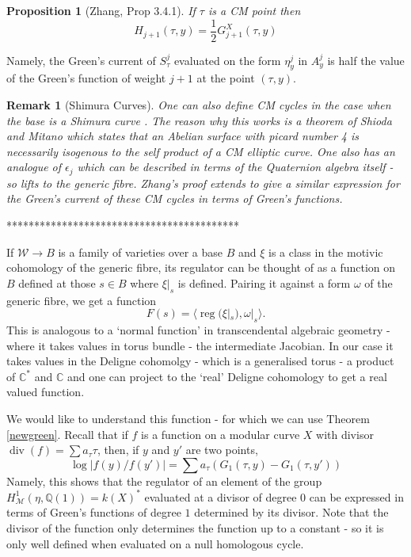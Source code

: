 \documentclass[11pt,a4paper]{article}
\newtheorem{prop}[defn]{Proposition}
\newtheorem{rem}[defn]{Remark}
\newcommand {\WW}{{\mathcal W}}
\newcommand {\C}{{\mathds C}}
\newcommand {\Q}{{\mathds Q}}
\newcommand {\M}{{\mathcal M}}
\def\div{\operatorname{div}}
\def\reg{\operatorname{reg}}
\begin{document}
\begin{prop}[Zhang, Prop 3.4.1] If $\tau$ is a CM point then  
%
$$H_{j+1}(\tau,y)=\frac{1}{2}G^X_{j+1}(\tau,y)$$
%
\end{prop}

Namely, the Green's current of $S^j_{\tau}$ evaluated on the form $\eta^j_y$ in $A_y^j$ is half the value of the Green's function of weight $j+1$ at the point $(\tau,y)$. 

\begin{rem}[Shimura Curves]
	
	One can also define CM cycles in the case when the base is a Shimura curve \cite{bess}. The reason why this works is a theorem of Shioda and Mitano \cite{shmi} which states that an Abelian surface with picard number 4 is necessarily isogenous to the self product of a CM elliptic curve. One also has an analogue of $\epsilon_j$ which can be described in terms of the Quaternion algebra itself - so lifts to the generic fibre. 
	Zhang's proof extends to give a similar expression for the Green's current of these CM cycles in terms of Green's functions. 

	
\end{rem}

******************************************

\fi

If $\WW \rightarrow B$ is a family of varieties over a base $B$ and $\xi$ is a class in the motivic cohomology of the generic fibre, its regulator can be thought of as a function on $B$ defined at those $s \in B$ where $\xi|_s$ is defined.  
Pairing it against a form $\omega$ of the generic fibre, we get a function
%
$$ F(s)=\langle \reg(\xi|_s),\omega|_s\rangle.$$
%
This is analogous to a `normal function' in transcendental algebraic geometry - where it takes values in torus bundle - the intermediate Jacobian. In our case it takes values in the Deligne cohomolgy - which is  a generalised torus - a product of $\C^*$ and $\C$ and one can project to the `real' Deligne cohomology to get a real valued function. 

We would like to understand this function - for which we can use Theorem \ref{newgreen}. Recall that if $f$ is a function on a modular curve $X$  with divisor $\div(f)=\sum a_{\tau} {\tau}$, then, if $y$ and $y'$ are two points,  
%
$$\log|f(y)/f(y')|=\sum a_{\tau} (G_1(\tau,y)-G_1(\tau,y'))$$
% 
Namely, this shows that the regulator of an element of the group $H^1_{\M}(\eta,\Q(1))=k(X)^*$ evaluated at a divisor of degree $0$ can be expressed in terms of Green's functions of degree $1$ determined by its divisor. Note that the divisor of the function only determines the function up to a constant - so it is only well defined when evaluated on a null homologous cycle. 
\end{document}
